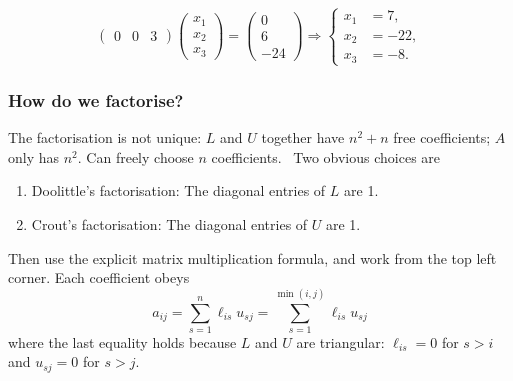 \documentclass{beamer}
\begin{document}
\begin{frame}
\begin{overlayarea}{\textwidth}{0.8\textheight}
{\begin{equation*}
\begin{pmatrix}
        0 & 0 & 3
      \end{pmatrix}
      \begin{pmatrix}
        x_1 \\ x_2 \\ x_3
      \end{pmatrix} =
      \begin{pmatrix}
        0 \\ 6 \\ -24
      \end{pmatrix}
      \Rightarrow \left\{
        \begin{aligned}
          x_1 & = 7, \\
          x_2 & = -22, \\
          x_3 & = -8.
        \end{aligned}
      \right.
    \end{equation*}
  }
  \end{overlayarea}


\end{frame}

\begin{frame}
  \frametitle{How do we factorise?}
  
  The factorisation is not unique: $L$ and $U$ together have $n^2+n$
  free coefficients; $A$ only has $n^2$.  Can freely choose $n$
  coefficients. \pause\  Two obvious choices are
  \begin{enumerate}
  \item Doolittle's factorisation: The diagonal entries of $L$ are 1.
  \item Crout's factorisation: The diagonal entries of $U$ are 1.
  \end{enumerate} \pause

  \vspace{1ex}

  Then use the explicit matrix multiplication formula, and work from
  the top left corner. Each coefficient obeys
  \begin{equation*}
    a_{i j} = \sum_{s=1}^n \ell_{i s} u_{s j} = \sum_{s=1}^{\min(i,j)}
     \ell_{i s} u_{s j}
  \end{equation*}
  where the last equality holds because $L$ and $U$ are triangular:
  $\ell_{i s} = 0$ for $s > i$ and $u_{s j} = 0$ for $s > j$.
  
\end{frame}
\end{document}
